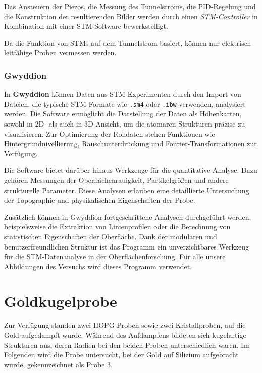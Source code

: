 \documentclass{article}
\newcommand{\defc}{black}
\newcommand{\colorT}[2][blue]{\color{#1}{#2}\color{\defc}}
\newcommand{\todo}[1]{\colorT[red]{\textbf{(#1)}}}
\begin{document}
Das Ansteuern der Piezos, die Messung des Tunnelstroms, die PID-Regelung und die Konstruktion der resultierenden Bilder werden
durch einen \textit{STM-Controller} in Kombination mit einer STM-Software bewerkstelligt.

Da die Funktion von STMs auf dem Tunnelstrom basiert, können nur elektrisch leitfähige
Proben vermessen werden. 

\subsubsection*{Gwyddion} 
In \textbf{Gwyddion} können Daten aus STM-Experimenten durch den Import von Dateien, die typische STM-Formate wie \texttt{.sm4} oder \texttt{.ibw} verwenden, analysiert werden. Die Software ermöglicht die Darstellung der Daten als Höhenkarten, sowohl in 2D- als auch in 3D-Ansicht, um die atomaren Strukturen präzise zu visualisieren. Zur Optimierung der Rohdaten stehen Funktionen wie Hintergrundnivellierung, Rauschunterdrückung und Fourier-Transformationen zur Verfügung.

Die Software bietet darüber hinaus Werkzeuge für die quantitative Analyse. Dazu gehören Messungen der Oberflächenrauigkeit, Partikelgrößen und andere strukturelle Parameter. Diese Analysen erlauben eine detaillierte Untersuchung der Topographie und physikalischen Eigenschaften der Probe.

Zusätzlich können in Gwyddion fortgeschrittene Analysen durchgeführt werden, beispielsweise die Extraktion von Linienprofilen oder die Berechnung von statistischen Eigenschaften der Oberfläche. Dank der modularen und benutzerfreundlichen Struktur ist das Programm ein unverzichtbares Werkzeug für die STM-Datenanalyse in der Oberflächenforschung. Für alle unsere Abbildungen des Versuchs wird dieses Programm verwendet.

\section{Goldkugelprobe}

Zur Verfügung standen zwei HOPG-Proben sowie zwei Kristallproben, auf die Gold aufgedampft wurde. Während des Aufdampfens bildeten sich kugelartige Strukturen aus, deren Radien bei den beiden Proben unterschiedlich waren. Im Folgenden wird die Probe untersucht, bei der Gold auf Silizium aufgebracht wurde, gekennzeichnet als Probe 3.
\end{document}
